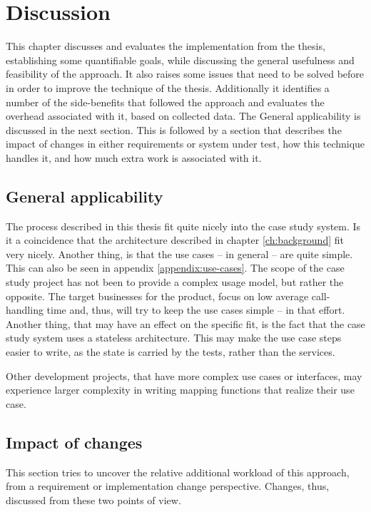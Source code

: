 \chapter{Discussion}

This chapter discusses and evaluates the implementation from the thesis, establishing some quantifiable goals, while discussing the general usefulness and feasibility of the approach. It also raises some issues that need to be solved before in order to improve the technique of the thesis. Additionally it identifies a number of the side-benefits that followed the approach and evaluates the overhead associated with it, based on collected data. The General applicability is discussed in the next section. This is followed by a section that describes the impact of changes in either requirements or system under test, how this technique handles it, and how much extra work is associated with it.


\section{General applicability}
The process described in this thesis fit quite nicely into the case study system. Is it a coincidence that the architecture described in chapter \ref{ch:background} fit very nicely. Another thing, is that the use cases -- in general -- are quite simple. This can also be seen in appendix \ref{appendix:use-cases}. The scope of the case study project has not been to provide a complex usage model, but rather the opposite. The target businesses for the product, focus on low average call-handling time and, thus, will try to keep the use cases simple -- in that effort. Another thing, that may have an effect on the specific fit, is the fact that the case study system uses a stateless architecture. This may make the use case steps easier to write, as the state is carried by the tests, rather than the services.\medskip

\noindent Other development projects, that have more complex use cases or interfaces, may experience larger complexity in writing mapping functions that realize their use case.

\section{Impact of changes}
This section tries to uncover the relative additional workload of this approach, from a requirement or implementation change perspective. Changes, thus, discussed from these two points of view.

